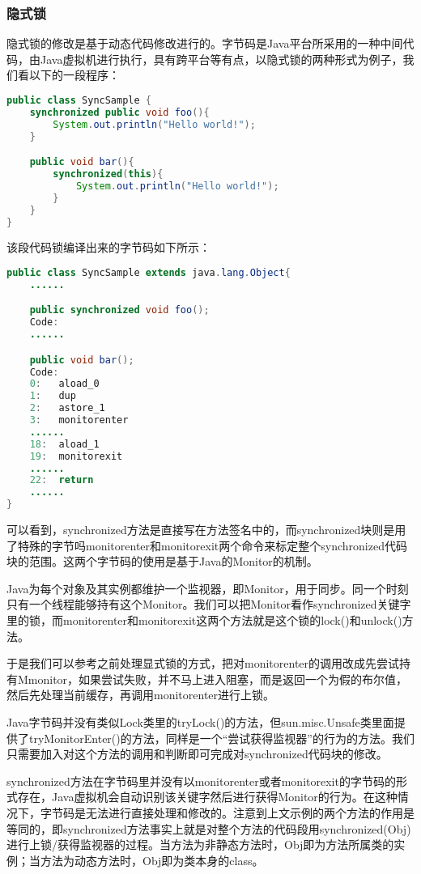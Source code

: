\subsubsection{隐式锁}

隐式锁的修改是基于动态代码修改进行的。字节码是Java平台所采用的一种中间代码，由Java虚拟机进行执行，具有跨平台等有点，以隐式锁的两种形式为例子，我们看以下的一段程序：

\begin{lstlisting}[language=Java]
public class SyncSample {
	synchronized public void foo(){
		System.out.println("Hello world!");
	}

	public void bar(){
		synchronized(this){
			System.out.println("Hello world!");
		}
	}
}
\end{lstlisting}

该段代码锁编译出来的字节码如下所示：

\begin{lstlisting}[language=Java]
public class SyncSample extends java.lang.Object{
	......

	public synchronized void foo();
	Code:
	......

	public void bar();
	Code:
	0:   aload_0
	1:   dup
	2:   astore_1
	3:   monitorenter
	......
	18:  aload_1
	19:  monitorexit
	......
	22:  return
	......
}
\end{lstlisting}

可以看到，synchronized方法是直接写在方法签名中的，而synchronized块则是用了特殊的字节吗monitorenter和monitorexit两个命令来标定整个synchronized代码块的范围。这两个字节码的使用是基于Java的Monitor的机制。

Java为每个对象及其实例都维护一个监视器，即Monitor，用于同步。同一个时刻只有一个线程能够持有这个Monitor。我们可以把Monitor看作synchronized关键字里的锁，而monitorenter和monitorexit这两个方法就是这个锁的lock()和unlock()方法。

于是我们可以参考之前处理显式锁的方式，把对monitorenter的调用改成先尝试持有Mmonitor，如果尝试失败，并不马上进入阻塞，而是返回一个为假的布尔值，然后先处理当前缓存，再调用monitorenter进行上锁。

Java字节码并没有类似Lock类里的tryLock()的方法，但sun.misc.Unsafe类里面提供了tryMonitorEnter()的方法，同样是一个“尝试获得监视器”的行为的方法。我们只需要加入对这个方法的调用和判断即可完成对synchronized代码块的修改。

synchronized方法在字节码里并没有以monitorenter或者monitorexit的字节码的形式存在，Java虚拟机会自动识别该关键字然后进行获得Monitor的行为。在这种情况下，字节码是无法进行直接处理和修改的。注意到上文示例的两个方法的作用是等同的，即synchronized方法事实上就是对整个方法的代码段用synchronized(Obj)进行上锁/获得监视器的过程。当方法为非静态方法时，Obj即为方法所属类的实例；当方法为动态方法时，Obj即为类本身的class。

